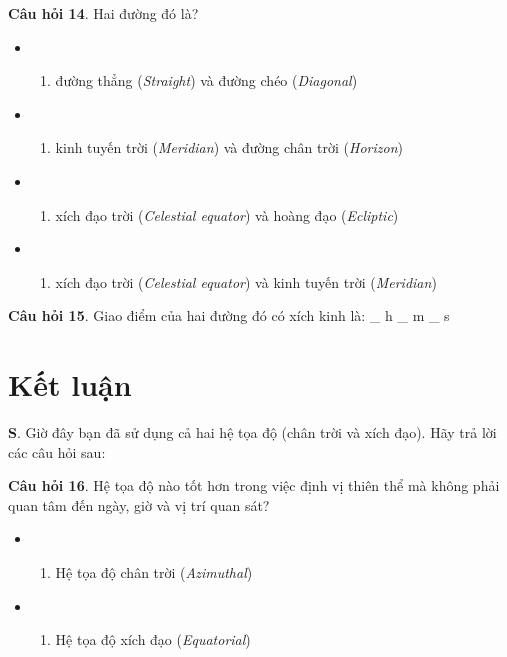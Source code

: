 \documentclass[
  a4paper,
]{book}
\providecommand{\tightlist}{%
  \setlength{\itemsep}{0pt}\setlength{\parskip}{0pt}}
\begin{document}
\textbf{Câu hỏi 14}. Hai đường đó là?

\begin{itemize}
\tightlist
\item
  \begin{enumerate}
  \def\labelenumi{(\Alph{enumi})}
  \tightlist
  \item
    đường thẳng (\emph{Straight}) và đường chéo (\emph{Diagonal})\\
  \end{enumerate}
\item
  \begin{enumerate}
  \def\labelenumi{(\Alph{enumi})}
  \setcounter{enumi}{1}
  \tightlist
  \item
    kinh tuyến trời (\emph{Meridian}) và đường chân trời (\emph{Horizon})\\
  \end{enumerate}
\item
  \begin{enumerate}
  \def\labelenumi{(\Alph{enumi})}
  \setcounter{enumi}{2}
  \tightlist
  \item
    xích đạo trời (\emph{Celestial equator}) và hoàng đạo (\emph{Ecliptic})\\
  \end{enumerate}
\item
  \begin{enumerate}
  \def\labelenumi{(\Alph{enumi})}
  \setcounter{enumi}{3}
  \tightlist
  \item
    xích đạo trời (\emph{Celestial equator}) và kinh tuyến trời (\emph{Meridian})
  \end{enumerate}
\end{itemize}

\textbf{Câu hỏi 15}. Giao điểm của hai đường đó có xích kinh là:
\_ h
\_ m
\_ s

\section{Kết luận}\label{kux1ebft-luux1eadn}

\textbf{S}. Giờ đây bạn đã sử dụng cả hai hệ tọa độ (chân trời và xích đạo). Hãy trả lời các câu hỏi sau:

\textbf{Câu hỏi 16}. Hệ tọa độ nào tốt hơn trong việc định vị thiên thể mà không phải quan tâm đến ngày, giờ và vị trí quan sát?

\begin{itemize}
\tightlist
\item
  \begin{enumerate}
  \def\labelenumi{(\Alph{enumi})}
  \tightlist
  \item
    Hệ tọa độ chân trời (\emph{Azimuthal})\\
  \end{enumerate}
\item
  \begin{enumerate}
  \def\labelenumi{(\Alph{enumi})}
  \setcounter{enumi}{1}
  \tightlist
  \item
    Hệ tọa độ xích đạo (\emph{Equatorial})
  \end{enumerate}
\end{itemize}
\end{document}
